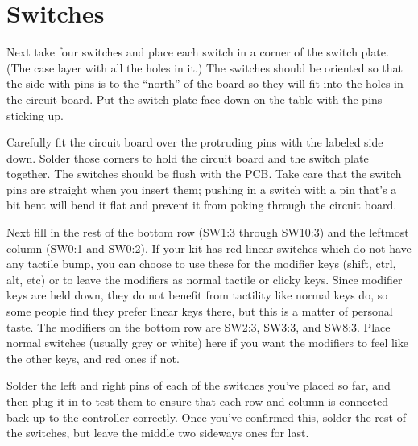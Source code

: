 \documentclass{article}
\begin{document}
\section{Switches}

Next take four switches and place each switch in a corner of the
switch plate. (The case layer with all the holes in it.) The switches
should be oriented so that the side with pins is to the ``north'' of
the board so they will fit into the holes in the circuit board. Put
the switch plate face-down on the table with the pins sticking
up.

Carefully fit the circuit board over the protruding pins with the
labeled side down. Solder those corners to hold the circuit board and
the switch plate together. The switches should be flush with the
PCB. Take care that the switch pins are straight when you insert them;
pushing in a switch with a pin that's a bit bent will bend it flat and
prevent it from poking through the circuit board.

\vspace{1em}
\noindent{}
\vspace{1em}

Next fill in the rest of the bottom row (SW1:3 through SW10:3) and the
leftmost column (SW0:1 and SW0:2). If your kit has red linear switches
which do not have any tactile bump, you can choose to use these for
the modifier keys (shift, ctrl, alt, etc) or to leave the modifiers as
normal tactile or clicky keys. Since modifier keys are held down, they
do not benefit from tactility like normal keys do, so some people find
they prefer linear keys there, but this is a matter of personal
taste. The modifiers on the bottom row are SW2:3, SW3:3, and SW8:3.
Place normal switches (usually grey or white) here if you want the
modifiers to feel like the other keys, and red ones if not.

\vspace{1em}

Solder the left and right pins of each of the switches you've placed so
far, and then plug it in to test them to ensure that each row and column is
connected back up to the controller correctly. Once you've confirmed
this, solder the rest of the switches, but leave the middle two
sideways ones for last.
\end{document}
